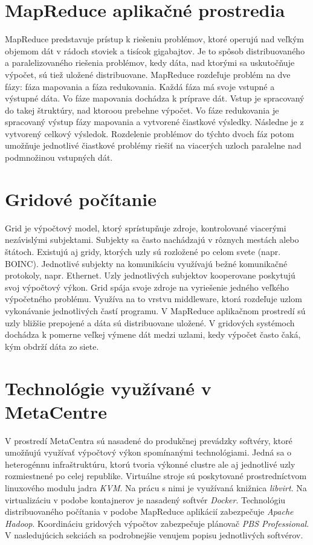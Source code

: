 \documentclass[printed,11pt,twoside,color,cover,table]{fithesis3}
\begin{document}
\section{MapReduce aplikačné prostredia}
MapReduce predstavuje prístup k riešeniu problémov, ktoré operujú nad veľkým objemom dát v rádoch stoviek a tisícok gigabajtov\cite{hadoop}. Je to spôsob distribuovaného a paralelizovaného riešenia problémov,
kedy dáta, nad ktorými sa uskutočňuje výpočet, sú tiež uložené distribuovane. MapReduce rozdeľuje problém na dve fázy: fáza mapovania a fáza redukovania.
Každá fáza má svoje vstupné a výstupné dáta. Vo fáze mapovania dochádza k príprave dát. Vstup je spracovaný do takej štruktúry, nad ktoroou prebehne výpočet. Vo fáze redukovania
je spracovaný výstup fázy mapovania a vytvorené čiastkové výsledky. Následne je z vytvorený celkový výsledok. Rozdelenie problémov do týchto dvoch fáz potom umožňuje jednotlivé čiastkové problémy riešiť
na viacerých uzloch paralelne nad podmnožinou vstupných dát. 

\section{Gridové počítanie}
Grid je výpočtový model, ktorý sprístupňuje zdroje, kontrolované viacerými nezávislými subjektami. Subjekty sa často nachádzajú v rôznych mestách alebo štátoch. Existujú aj gridy,
ktorých uzly sú rozložené po celom svete (napr. BOINC\footnotemark{}). Jednotlivé subjekty na komunikáciu využívajú bežné
komunikačné protokoly, napr. Ethernet. Uzly jednotlivých subjektov kooperovane poskytujú svoj výpočtový výkon. Grid spája
svoje zdroje na vyriešenie jedného veľkého výpočetného problému\cite{grid}. Využíva na to vrstvu middleware, ktorá rozdeľuje uzlom vykonávanie jednotlivých častí programu. 
V MapReduce aplikačnom prostredí sú uzly bližšie prepojené a
dáta sú distribuovane uložené. V gridových systémoch dochádza k pomerne veľkej výmene dát medzi uzlami, kedy výpočet často čaká, kým obdrží dáta zo siete\cite{hadoop}. 

\section{Technológie využívané v MetaCentre}
V prostredí MetaCentra sú nasadené do produkčnej prevádzky softvéry, ktoré umožňujú využívať výpočtový výkon spomínanými technológiami. Jedná sa o heterogénnu infraštruktúru, ktorú tvoria výkonné clustre ale 
aj jednotlivé uzly rozmiestnené po celej republike. Virtuálne stroje sú poskytované prostredníctvom linuxového modulu jadra \textit{KVM}\footnotemark{}\cite{kvm}. 
Na prácu s nimi je využívaná knižnica \textit{libvirt}\cite{libvirt}. 
Na virtualizáciu v podobe kontajnerov je nasadený softvér \textit{Docker}\cite{docker}. Technológiu distribuovaného počítania v podobe MapReduce aplikácií zabezpečuje \textit{Apache Hadoop}\cite{hadoop}.
Koordináciu gridových výpočtov zabezpečuje plánovač \textit{PBS Professional}\footnotemark{}. V nasledujúcich sekciách sa podrobnejšie venujem popisu jednotlivých softvérov.
 
\end{document}
